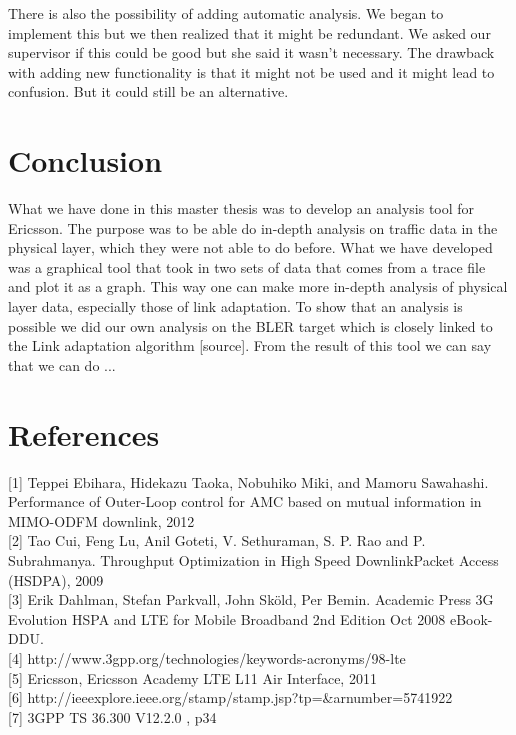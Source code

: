 \documentclass[cropmarks, frame, english]{idamasterthesis}
\begin{document}
There is also the possibility of adding automatic analysis. We began to implement this but we then realized that it might be redundant. We asked our supervisor if this could be good but she said it wasn't necessary. The drawback with adding new functionality is that it might not be used and it might lead to confusion. But it could still be an alternative.  


\chapter{Conclusion} %

What we have done in this master thesis was to develop an analysis tool for Ericsson. The purpose was to be able do in-depth analysis on traffic data in the physical layer, which they were not able to do before. What we have developed was a graphical tool that took in two sets of data that comes from a trace file and plot it as a graph. This way one can make more in-depth analysis of physical layer data, especially those of link adaptation. To show that an analysis is possible we did our own analysis on the BLER target which is closely linked to the Link adaptation algorithm [source]. From the result of this tool we can say that we can do ...

\newpage




\chapter*{References}
[1] Teppei Ebihara, Hidekazu Taoka, Nobuhiko Miki, and Mamoru Sawahashi. Performance of Outer-Loop control for AMC based on mutual information in MIMO-ODFM downlink, 2012 \\

[2] Tao Cui, Feng Lu, Anil Goteti, V. Sethuraman, S. P. Rao and P. Subrahmanya. Throughput Optimization in High Speed DownlinkPacket Access (HSDPA), 2009 \\

[3] Erik Dahlman, Stefan Parkvall, John Sk\"{o}ld, Per Bemin. Academic Press 3G Evolution HSPA and LTE for Mobile Broadband 2nd Edition Oct 2008 eBook-DDU. \\

[4] http://www.3gpp.org/technologies/keywords-acronyms/98-lte \\

[5] Ericsson, Ericsson Academy LTE L11 Air Interface, 2011 \\

[6] http://ieeexplore.ieee.org/stamp/stamp.jsp?tp=\&arnumber=5741922 \\ %

[7] 3GPP TS 36.300 V12.2.0 , p34\\

\end{document}

